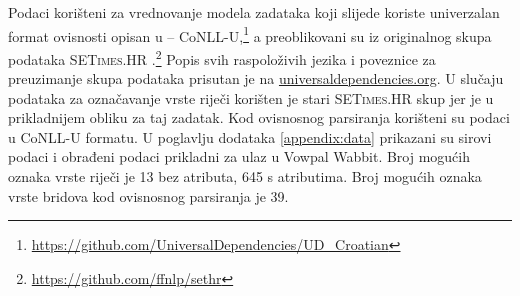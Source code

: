 Podaci korišteni za vrednovanje modela zadataka koji slijede koriste univerzalan
format ovisnosti  opisan u \citep{univdeps12} --
CoNLL-U,\footnote{\url{https://github.com/UniversalDependencies/UD_Croatian}} a
preoblikovani su iz originalnog skupa podataka \textsc{SETimes.HR}
\citep{agic2014setimes}.\footnote{\url{https://github.com/ffnlp/sethr}} Popis
svih raspoloživih jezika i poveznice za preuzimanje skupa podataka prisutan je
na \href{http://universaldependencies.org/}{universaldependencies.org}. U
slučaju podataka za označavanje vrste riječi korišten je stari
\textsc{SETimes.HR} skup jer je u prikladnijem obliku za taj zadatak. Kod
ovisnosnog parsiranja korišteni su podaci u CoNLL-U formatu. U poglavlju
dodataka \ref{appendix:data} prikazani su sirovi podaci i obrađeni podaci
prikladni za ulaz u Vowpal Wabbit. Broj mogućih oznaka vrste riječi je 13 bez
atributa, 645 s atributima. Broj mogućih oznaka vrste bridova kod ovisnosnog
parsiranja je 39.
